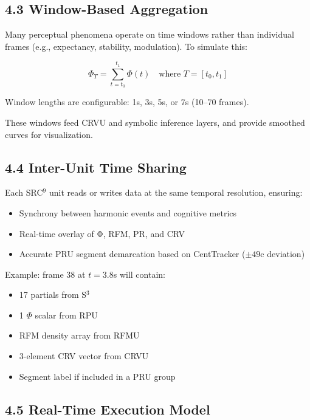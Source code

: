 \subsection*{4.3 Window-Based Aggregation}

Many perceptual phenomena operate on time windows rather than individual frames (e.g., expectancy, stability, modulation). To simulate this:

\begin{equation}
\Phi_T = \sum_{t=t_0}^{t_1} \Phi(t)
\quad \text{where } T = [t_0, t_1]
\end{equation}

Window lengths are configurable: 1s, 3s, 5s, or 7s (10–70 frames). 

These windows feed CRVU and symbolic inference layers, and provide smoothed curves for visualization.

\subsection*{4.4 Inter-Unit Time Sharing}

Each SRC$^9$ unit reads or writes data at the same temporal resolution, ensuring:

\begin{itemize}
    \item Synchrony between harmonic events and cognitive metrics
    \item Real-time overlay of Φ, RFM, PR, and CRV
    \item Accurate PRU segment demarcation based on CentTracker ($\pm49$c deviation)
\end{itemize}

Example: frame 38 at $t=3.8$s will contain:

\begin{itemize}
    \item 17 partials from S$^3$
    \item 1 $\Phi$ scalar from RPU
    \item RFM density array from RFMU
    \item 3-element CRV vector from CRVU
    \item Segment label if included in a PRU group
\end{itemize}

\subsection*{4.5 Real-Time Execution Model}

